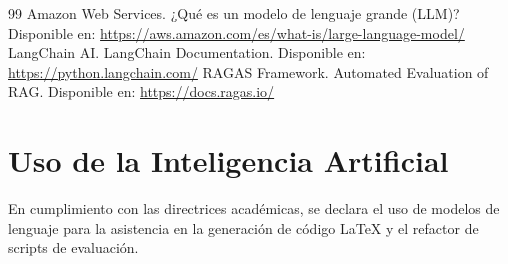\documentclass[12pt,a4paper,oneside]{report}
\begin{document}
\begin{thebibliography}{99}
     Amazon Web Services. ¿Qué es un modelo de lenguaje grande (LLM)? Disponible en: \url{https://aws.amazon.com/es/what-is/large-language-model/}
     LangChain AI. LangChain Documentation. Disponible en: \url{https://python.langchain.com/}
     RAGAS Framework. Automated Evaluation of RAG. Disponible en: \url{https://docs.ragas.io/}
\end{thebibliography}

\appendix
\chapter{Uso de la Inteligencia Artificial}
En cumplimiento con las directrices académicas, se declara el uso de modelos de lenguaje para la asistencia en la generación de código LaTeX y el refactor de scripts de evaluación.
\end{document}
